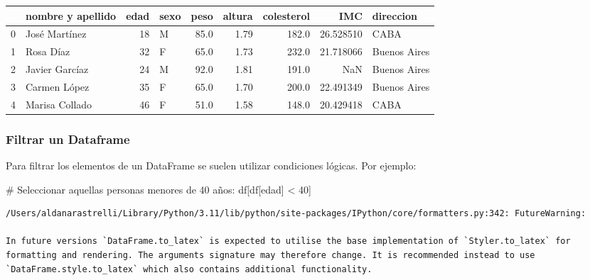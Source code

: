\documentclass[
  letterpaper,
  DIV=11,
  numbers=noendperiod]{scrreprt}
\newenvironment{Shaded}{\begin{snugshade}}{\end{snugshade}}
\newcommand{\CommentTok}[1]{\textcolor[rgb]{0.37,0.37,0.37}{#1}}
\newcommand{\DecValTok}[1]{\textcolor[rgb]{0.68,0.00,0.00}{#1}}
\newcommand{\NormalTok}[1]{\textcolor[rgb]{0.00,0.23,0.31}{#1}}
\newcommand{\OperatorTok}[1]{\textcolor[rgb]{0.37,0.37,0.37}{#1}}
\newcommand{\StringTok}[1]{\textcolor[rgb]{0.13,0.47,0.30}{#1}}
\begin{document}
\begin{tabular}{llrlrrrrl}
\toprule
{} & nombre y apellido &  edad & sexo &  peso &  altura &  colesterol &        IMC &     direccion \\
\midrule
0 &     José Martínez &    18 &    M &  85.0 &    1.79 &       182.0 &  26.528510 &          CABA \\
1 &         Rosa Díaz &    32 &    F &  65.0 &    1.73 &       232.0 &  21.718066 &  Buenos Aires \\
2 &    Javier Garcíaz &    24 &    M &  92.0 &    1.81 &       191.0 &        NaN &  Buenos Aires \\
3 &      Carmen López &    35 &    F &  65.0 &    1.70 &       200.0 &  22.491349 &  Buenos Aires \\
4 &    Marisa Collado &    46 &    F &  51.0 &    1.58 &       148.0 &  20.429418 &          CABA \\
\bottomrule
\end{tabular}

\subsubsection{Filtrar un Dataframe}\label{filtrar-un-dataframe}

Para filtrar los elementos de un DataFrame se suelen utilizar
condiciones lógicas. Por ejemplo:

\begin{Shaded}
\begin{Highlighting}[]
\CommentTok{\# Seleccionar aquellas personas menores de 40 años:}
\NormalTok{df[df[}\StringTok{\textquotesingle{}edad\textquotesingle{}}\NormalTok{] }\OperatorTok{\textless{}} \DecValTok{40}\NormalTok{]}
\end{Highlighting}
\end{Shaded}

\begin{verbatim}
/Users/aldanarastrelli/Library/Python/3.11/lib/python/site-packages/IPython/core/formatters.py:342: FutureWarning:

In future versions `DataFrame.to_latex` is expected to utilise the base implementation of `Styler.to_latex` for formatting and rendering. The arguments signature may therefore change. It is recommended instead to use `DataFrame.style.to_latex` which also contains additional functionality.
\end{verbatim}
\end{document}
